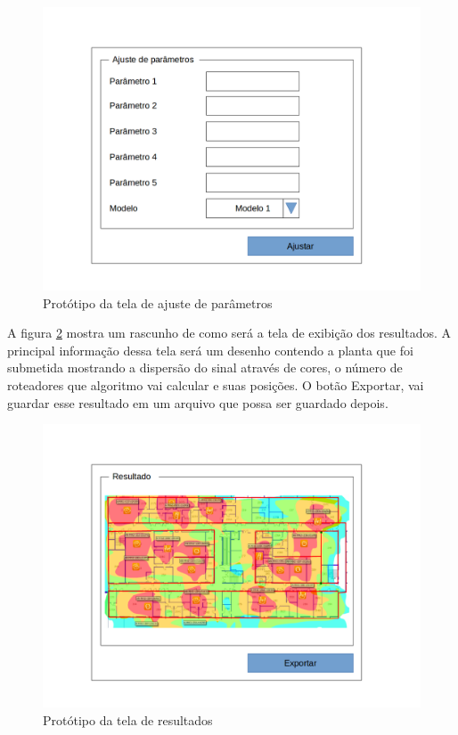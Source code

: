 \documentclass[tc,twoside]{iiufrgs}
\begin{document}
\begin{figure}[!h]
	\centering
	\includegraphics[scale=0.4]{img/prototipo2.png}
	\caption{Protótipo da tela de ajuste de parâmetros}
	\label{fig:prototipoDois}
\end{figure}

A figura \ref{fig:prototipoTres} mostra um rascunho de como será a tela de exibição dos resultados. A principal informação dessa tela será um desenho contendo a planta que foi submetida mostrando a dispersão do sinal através de cores, o número de roteadores que algoritmo vai calcular e suas posições. O botão Exportar, vai guardar esse resultado em um arquivo que possa ser guardado depois. 

\begin{figure}[!h]
	\centering
	\includegraphics[scale=0.4]{img/prototipo3.png}
	\caption{Protótipo da tela de resultados}
	\label{fig:prototipoTres}
\end{figure}
\end{document}
